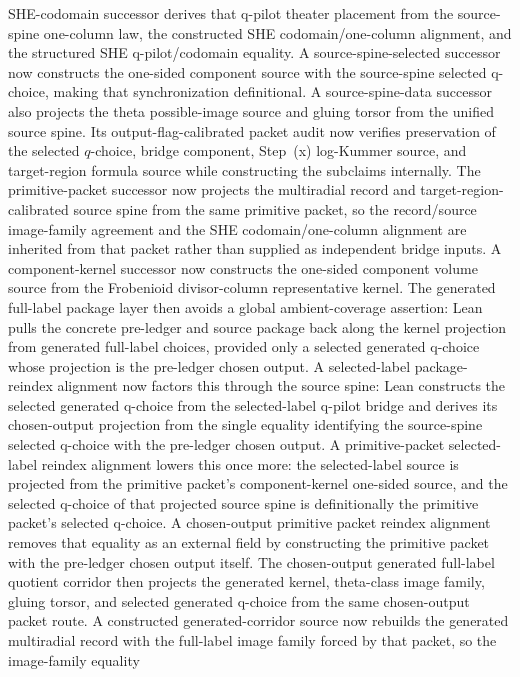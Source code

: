 \documentclass[11pt]{article}
\theoremstyle{plain}
\theoremstyle{definition}
\theoremstyle{remark}
\begin{document}
SHE-codomain successor derives that q-pilot theater placement from the
source-spine one-column law, the constructed SHE codomain/one-column alignment,
and the structured SHE q-pilot/codomain equality.  A source-spine-selected
successor now constructs the one-sided component source with the source-spine
selected q-choice, making that synchronization definitional.  A
source-spine-data successor also projects the theta possible-image source and
gluing torsor from the unified source spine.  Its output-flag-calibrated packet
audit now verifies preservation of the selected \(q\)-choice, bridge component,
Step~(x) log-Kummer source, and target-region formula source while constructing
the subclaims internally.  The primitive-packet successor
now projects the multiradial record and target-region-calibrated source spine
from the same primitive packet, so the record/source image-family agreement and
the SHE codomain/one-column alignment are inherited from that packet rather
than supplied as independent bridge inputs.  A component-kernel successor now
constructs the one-sided component volume source from the Frobenioid
divisor-column representative kernel.  The generated full-label package layer
then avoids a global ambient-coverage assertion: Lean pulls the concrete
pre-ledger and source package back along the kernel projection from generated
full-label choices, provided only a selected generated q-choice whose
projection is the pre-ledger chosen output.  A selected-label package-reindex
alignment now factors this through the source spine: Lean constructs the
selected generated q-choice from the selected-label q-pilot bridge and derives
its chosen-output projection from the single equality identifying the
source-spine selected q-choice with the pre-ledger chosen output.  A
primitive-packet selected-label reindex alignment lowers this once more: the
selected-label source is projected from the primitive packet's component-kernel
one-sided source, and the selected q-choice of that projected source spine is
definitionally the primitive packet's selected q-choice.  A chosen-output
primitive packet reindex alignment removes that equality as an external field
by constructing the primitive packet with the pre-ledger chosen output itself.
The chosen-output generated full-label quotient corridor then projects the
generated kernel, theta-class image family, gluing torsor, and selected
generated q-choice from the same chosen-output packet route.  A constructed
generated-corridor source now rebuilds the generated multiradial record with
the full-label image family forced by that packet, so the image-family equality
\end{document}
